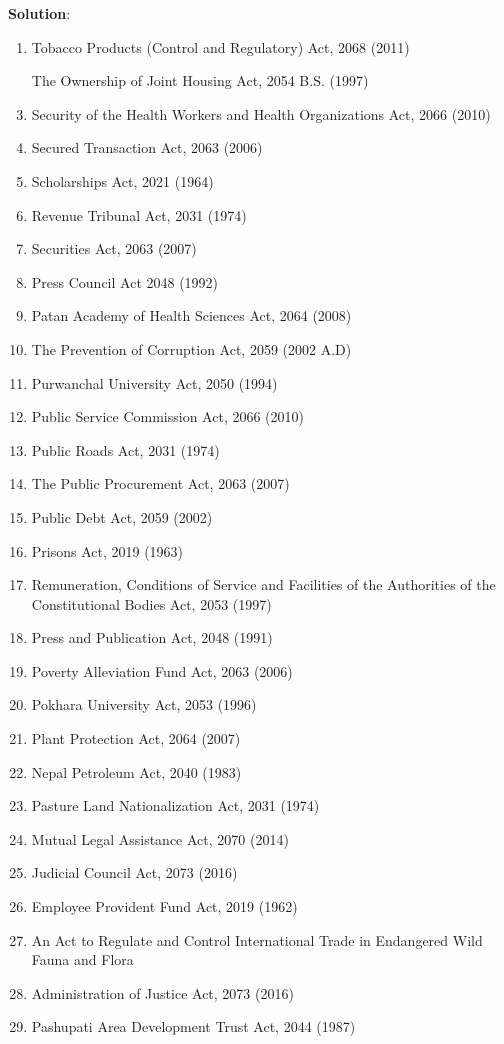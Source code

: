 \documentclass[
  openany]{book}
\newenvironment{solution}{ {\bfseries Solution}:}{}
\begin{document}
\begin{questions}
\begin{solution}
\begin{enumerate}
\item Tobacco Products (Control and Regulatory) Act, 2068 (2011)
\item [The] Ownership of Joint Housing Act, 2054 B.S. (1997)
\item Security of the Health Workers and Health Organizations Act, 2066 (2010)
\item Secured Transaction Act, 2063 (2006)
\item Scholarships Act, 2021 (1964)
\item Revenue Tribunal Act, 2031 (1974)
\item Securities Act, 2063 (2007)
\item Press Council Act 2048 (1992) 
\item Patan Academy of Health Sciences Act, 2064 (2008)
\item The Prevention of Corruption Act, 2059 (2002 A.D)
\item Purwanchal University Act, 2050 (1994)
\item Public Service Commission Act, 2066 (2010)
\item Public Roads Act, 2031 (1974)
\item The Public Procurement Act, 2063 (2007)
\item Public Debt Act, 2059 (2002)
\item Prisons Act, 2019 (1963)
\item Remuneration, Conditions of Service and Facilities of the Authorities of the Constitutional Bodies Act, 2053 (1997)
\item Press and Publication Act, 2048 (1991)
\item Poverty Alleviation Fund Act, 2063 (2006)
\item Pokhara University Act, 2053 (1996)
\item Plant Protection Act, 2064 (2007)
\item Nepal Petroleum Act, 2040 (1983)
\item Pasture Land Nationalization Act, 2031 (1974)
\item Mutual Legal Assistance Act, 2070 (2014)
\item Judicial Council Act, 2073 (2016)
\item Employee Provident Fund Act, 2019 (1962)
\item An Act to Regulate and Control International Trade in Endangered Wild Fauna and Flora
\item Administration of Justice Act, 2073 (2016)
\item Pashupati Area Development Trust Act, 2044 (1987)

\end{enumerate}
\end{solution}
\end{questions}
\end{document}
